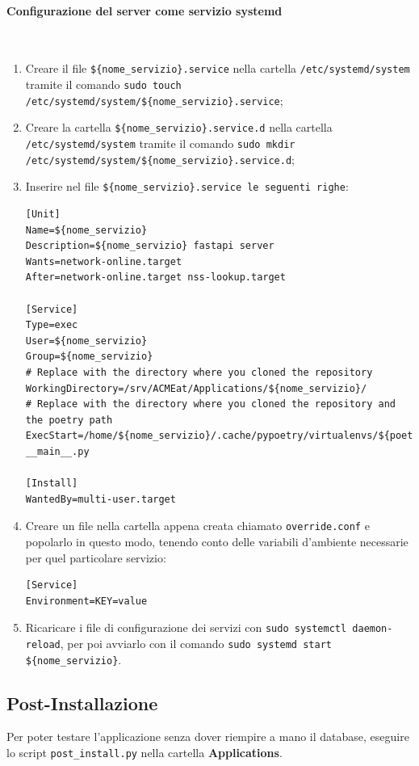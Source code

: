 \documentclass[11pt]{article} %
\begin{document}
\paragraph{Configurazione del server come servizio systemd}\mbox{}\\
\begin{enumerate}
\item Creare il file \verb|${nome_servizio}.service| nella cartella \verb|/etc/systemd/system| tramite il comando \verb|sudo touch /etc/systemd/system/${nome_servizio}.service|;
\item Creare la cartella \verb|${nome_servizio}.service.d| nella cartella \verb|/etc/systemd/system| tramite il comando \verb|sudo mkdir /etc/systemd/system/${nome_servizio}.service.d|;
\item Inserire nel file \verb|${nome_servizio}.service le seguenti righe|:
\begin{lstlisting}
[Unit]
Name=${nome_servizio}
Description=${nome_servizio} fastapi server
Wants=network-online.target
After=network-online.target nss-lookup.target

[Service]
Type=exec
User=${nome_servizio}
Group=${nome_servizio}
# Replace with the directory where you cloned the repository
WorkingDirectory=/srv/ACMEat/Applications/${nome_servizio}/
# Replace with the directory where you cloned the repository and the poetry path
ExecStart=/home/${nome_servizio}/.cache/pypoetry/virtualenvs/${poetry_path}/bin/python3 __main__.py

[Install]
WantedBy=multi-user.target
\end{lstlisting}
\item Creare un file nella cartella appena creata chiamato \verb|override.conf| e popolarlo in questo modo, tenendo conto delle variabili d'ambiente necessarie per quel particolare servizio:
\begin{lstlisting}
[Service]
Environment=KEY=value
\end{lstlisting}
\item Ricaricare i file di configurazione dei servizi con \verb|sudo systemctl daemon-reload|, per poi avviarlo con il comando \verb|sudo systemd start ${nome_servizio}|.
\end{enumerate}

\subsection{Post-Installazione}

Per poter testare l'applicazione senza dover riempire a mano il database, eseguire lo script \verb|post_install.py| nella cartella \textbf{Applications}.
\end{document}
